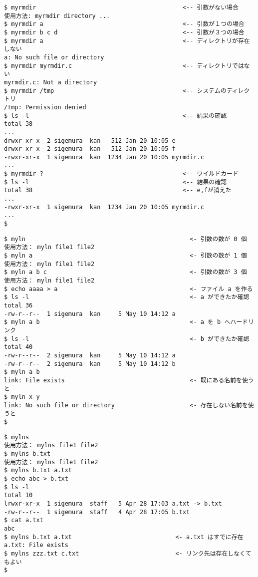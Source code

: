 \documentclass[a4j,dvipdfmx]{jarticle}
\begin{document}
\begin{enumerate}
\newpage

\begin{lstlisting}[caption=myrmdirの実行例（動作テスト！！）]
$ myrmdir                                         <-- 引数がない場合
使用方法: myrmdir directory ...
$ myrmdir a                                       <-- 引数が１つの場合
$ myrmdir b c d                                   <-- 引数が３つの場合
$ myrmdir a                                       <-- ディレクトリが存在しない
a: No such file or directory
$ myrmdir myrmdir.c                               <-- ディレクトリではない
myrmdir.c: Not a directory
$ myrmdir /tmp                                    <-- システムのディレクトリ
/tmp: Permission denied
$ ls -l                                           <-- 結果の確認
total 38
...
drwxr-xr-x  2 sigemura  kan   512 Jan 20 10:05 e
drwxr-xr-x  2 sigemura  kan   512 Jan 20 10:05 f
-rwxr-xr-x  1 sigemura  kan  1234 Jan 20 10:05 myrmdir.c
...
$ myrmdir ?                                       <-- ワイルドカード
$ ls -l                                           <-- 結果の確認
total 38                                          <-- e,fが消えた
...
-rwxr-xr-x  1 sigemura  kan  1234 Jan 20 10:05 myrmdir.c
...
$
\end{lstlisting}

\newpage

\begin{lstlisting}[caption=mylnの実行例（動作テスト！！）]
$ myln                                              <- 引数の数が 0 個
使用方法： myln file1 file2
$ myln a                                            <- 引数の数が 1 個
使用方法： myln file1 file2
$ myln a b c                                        <- 引数の数が 3 個
使用方法： myln file1 file2
$ echo aaaa > a                                     <- ファイル a を作る
$ ls -l                                             <- a ができたか確認
total 36
-rw-r--r--  1 sigemura  kan     5 May 10 14:12 a
$ myln a b                                          <- a を b へハードリンク
$ ls -l                                             <- b ができたか確認
total 40
-rw-r--r--  2 sigemura  kan     5 May 10 14:12 a
-rw-r--r--  2 sigemura  kan     5 May 10 14:12 b
$ myln a b
link: File exists                                   <- 既にある名前を使うと
$ myln x y
link: No such file or directory                     <- 存在しない名前を使うと
$
\end{lstlisting}

\newpage

\begin{lstlisting}[caption=mylnsの実行例（動作テスト！！）]
$ mylns
使用方法： mylns file1 file2
$ mylns b.txt
使用方法： mylns file1 file2
$ mylns b.txt a.txt
$ echo abc > b.txt
$ ls -l
total 10
lrwxr-xr-x  1 sigemura  staff   5 Apr 28 17:03 a.txt -> b.txt
-rw-r--r--  1 sigemura  staff   4 Apr 28 17:05 b.txt
$ cat a.txt
abc
$ mylns b.txt a.txt                             <- a.txt はすでに存在
a.txt: File exists
$ mylns zzz.txt c.txt                           <- リンク先は存在しなくてもよい
$ 
\end{lstlisting}


\end{enumerate}
\end{document}
